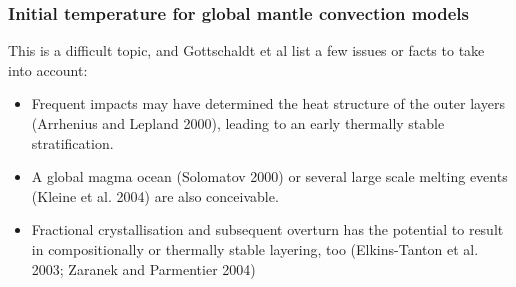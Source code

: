 



\subsubsection{Initial temperature for global mantle convection models}

This is a difficult topic, and Gottschaldt et al \cite{gows09} list a few issues or 
facts to take into account:
\begin{itemize}
\item Frequent  impacts  may  have  determined  the  heat structure of the outer layers (Arrhenius and Lepland 2000), leading to an early thermally stable stratification. 
\item A global magma ocean (Solomatov 2000)  or  several  large  scale  melting events  (Kleine et al. 2004)  are also conceivable. 
\item Fractional crystallisation and subsequent overturn has the potential to result in compositionally or thermally   stable   layering,   too   (Elkins-Tanton et al. 2003; Zaranek and Parmentier 2004)
\end{itemize}


